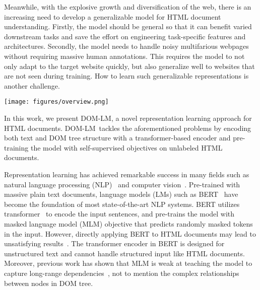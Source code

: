 \documentclass[sigconf, nonacm]{acmart}
\newcommand{\ours}[0]{DOM-LM}
\begin{document}
Meanwhile, with the explosive growth and diversification of the web, there is an increasing need to develop a generalizable model for HTML document understanding.
Firstly, the model should be general so that it can benefit varied downstream tasks and save the effort on engineering task-specific features and architectures.
Secondly, the model needs to handle noisy multifarious webpages without requiring massive human annotations. This requires the model to not only adapt to the target website quickly, but also generalize well to websites that are not seen during training. How to learn such generalizable representations is another challenge.

\begin{figure*}
    \centering
    \texttt{[image: figures/overview.png]}
    \vspace{-10pt}
    \caption{(a) shows the overall framework of \ours. We use extra position embeddings to model the DOM tree structure and encode the input with transformer encoder. The model is pre-trained with MLM objective by masking both individual tokens and entire nodes, and fine-tuned for downstream tasks with the learned node and token representations. We evaluate \ours\ on three tasks: attribute extraction, OpenIE and QA.
    (b) is an illustration of our DOM tree processor. Here we use a window of 5 and stride of 3\protect\footnotemark. At each step, yellow nodes are newly added, while red nodes will be pruned. The final subtree consists of the green and yellow nodes. }
    \vspace{-10pt}
    \label{fig:overview}
\end{figure*}

In this work, we present \ours, a novel representation learning approach for HTML documents. \ours\ tackles the aforementioned problems by encoding both text and DOM tree structure with a transformer-based encoder and pre-training the model with self-supervised objectives on unlabeled HTML documents.

Representation learning has achieved remarkable success in many fields such as natural language processing (NLP)~\cite{Peters2018DeepCW, devlin-etal-2019-bert, liu2019roberta} and computer vision~\cite{Chen2016InfoGANIR, Chen2020ASF}. Pre-trained with massive plain text documents, language models (LMs) such as BERT~\cite{devlin-etal-2019-bert} have become the foundation of most state-of-the-art NLP systems. BERT utilizes transformer~\cite{vaswani2017attention} to encode the input sentences, and pre-trains the model with masked language model (MLM) objective that predicts randomly masked tokens in the input. However, directly applying BERT to HTML documents may lead to unsatisfying results~\cite{zhou2021simplified}. The transformer encoder in BERT is designed for unstructured text and cannot handle structured input like HTML documents. Moreover, previous work has shown that MLM is weak at teaching the model to capture long-range dependencies~\cite{ram-etal-2021-shot,deng2021reasonbert}, not to mention the complex relationships between nodes in DOM tree.
\end{document}
